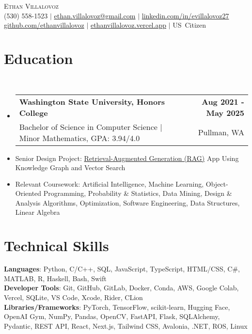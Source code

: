 \documentclass[letterpaper,11pt]{article}
\makeatletter
\newcommand{\resumeItem}[1]{
  \item\small{
    {#1 \vspace{0pt}}
  }
}
\newcommand{\resumeSubheading}[4]{
  \vspace{-2pt}\item
  \begin{tabular*}{1.0\textwidth}[t]{l@{\extracolsep{\fill}}r}
    \textbf{#1} & \textbf{\small #2} \\
    \textrm{\small#3} & \textrm{\small #4} \\
  \end{tabular*}\vspace{-7pt}
}
\newcommand{\resumeSubHeadingListStart}{\begin{itemize}[leftmargin=0.0in, label={}]}
\newcommand{\resumeSubHeadingListEnd}{\end{itemize}}\vspace{0pt}
\newcommand{\resumeItemListStart}{\begin{itemize}}
\newcommand{\resumeItemListEnd}{\end{itemize}\vspace{-5pt}}
\makeatother
\begin{document}
\begin{center}
  {\Large \scshape Ethan Villalovoz} \\[2mm]
  \footnotesize
  (530) 558-1523 $|$ 
  \href{mailto:ethan.villalovoz@gmail.com}{ethan.villalovoz@gmail.com} $|$
  \href{https://www.linkedin.com/in/evillalovoz27/}{linkedin.com/in/evillalovoz27} \\
  \href{https://github.com/ethanvillalovoz}{github.com/ethanvillalovoz} $|$
  \href{https://ethanvillalovoz.vercel.app/}{ethanvillalovoz.vercel.app} $|$
  US~Citizen
  \vspace{-8pt}
\end{center}

\section{Education} \\[1mm]
\resumeSubHeadingListStart
  \resumeSubheading
    {Washington State University, Honors College}{Aug 2021 - May 2025}
    {Bachelor of Science in Computer Science | Minor Mathematics, GPA: 3.94/4.0 }{Pullman, WA}
\resumeSubHeadingListEnd

\resumeItemListStart
  \resumeItem{Senior Design Project: \href{https://github.com/mollyiverson/ACME10-HE-RAGApp}{Retrieval-Augmented Generation (RAG)} App Using Knowledge Graph and Vector Search}
  \vspace{-7pt}
  \resumeItem{Relevant Coursework: Artificial Intelligence, Machine Learning, Object-Oriented Programming, Probability \& Statistics, Data Mining, Design \& Analysis Algorithms, Optimization, Software Engineering, Data Structures, Linear Algebra}
\resumeItemListEnd

\vspace{-12pt}

\section{Technical Skills}

\small{
  \textbf{Languages}{: Python, C/C++, SQL, JavaScript, TypeScript, HTML/CSS, C\#, MATLAB, R, Haskell, Bash, Swift} \\[1mm]
  \textbf{Developer Tools}{: Git, GitHub, GitLab, Docker, Conda, AWS, Google Colab, Vercel, SQLite, VS Code, Xcode, Rider, CLion}\\[1mm]
  \textbf{Libraries/Frameworks}{: PyTorch, TensorFlow, scikit-learn, Hugging Face, OpenAI Gym, NumPy, Pandas, OpenCV, FastAPI, Flask, SQLAlchemy, Pydantic, REST API, React, Next.js, Tailwind CSS, Avalonia, .NET, ROS, Linux}
}
\end{document}

